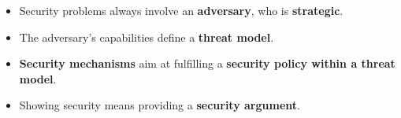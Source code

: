 \begin{keybox}[title=Summary]
\begin{itemize}
  \item Security problems always involve an \textbf{adversary}, who is \textbf{strategic}.
  \item The adversary's capabilities define a \textbf{threat model}.
  \item \textbf{Security mechanisms} aim at fulfilling a \textbf{security policy within a threat model}.
  \item Showing security means providing a \textbf{security argument}.
\end{itemize}
\end{keybox}

